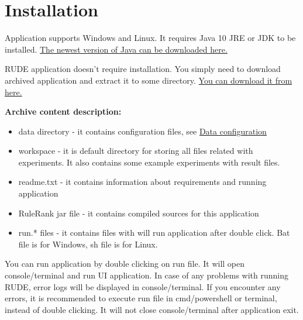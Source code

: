 \section{Installation}\label{section:install}

Application supports Windows and Linux. It requires Java 10 JRE or JDK to be installed. \href{http://www.oracle.com/technetwork/java/javase/downloads/index.html}{The newest version of Java can be downloaded here.} 

RUDE application doesn't require installation. You simply need to download archived application and extract it to some directory. \href{http://www.cs.put.poznan.pl/mszelag/Software/ruleRank/ruleRank.html}{You can download it from here.}\newline

\textbf{Archive content description:}
\begin{itemize}
	\item data directory - it contains configuration files, see \hyperref[section:data-config]{Data configuration}
	\item workspace - it is default directory for storing all files related with experiments. It also contains some example experiments with result files.
	\item readme.txt - it contains information about requirements and running application
	\item RuleRank jar file - it contains compiled sources for this application
	\item run.* files - it contains files with will run application after double click. Bat file is for Windows, sh file is for Linux.
\end{itemize}

You can run application by double clicking on run file. It will open console/terminal and run UI application. In case of any problems with running RUDE, error logs will be displayed in console/terminal. If you encounter any errors, it is recommended to execute run file in cmd/powershell or terminal, instead of double clicking. It will not close console/terminal after application exit.


\vfill\newpage
